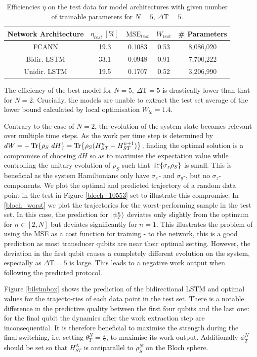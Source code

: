 \begin{table}[h]
	\centering
	\begin{tabular}{ c | c | c | c | c}
		Network Architecture & $\eta_{test} \ [\%]$ & $\mathrm{MSE}_{test}$ & $W_{test}$ & \# Parameters \\
		\hline
		FCANN        & 19.3 & 0.1083 & 0.53 & 8,086,020 \\
		Bidir. LSTM  & 33.1 & 0.0948 & 0.91 & 7,700,222 \\
		Unidir. LSTM & 19.5 & 0.1707 & 0.52 & 3,206,990\\
	\end{tabular}
	\caption{Efficiencies $\eta$ on the test data for model architectures with given number of trainable parameters for $N=5, \ \Delta \mathrm{T} = 5$.}
	\label{n5efftable}
\end{table}

The efficiency of the best model for $N=5, \ \Delta \mathrm{T} = 5$ is drastically lower than that for $N=2$.
Crucially, the models are unable to extract the test set average of the lower bound calculated by local optimisation $W_{lo} = 1.4$.

Contrary to the case of $N=2$, the evolution of the system state becomes relevant over multiple time steps.
As the work per time step is determined by $dW = -\Tr{\rho_S \ dH} = \Tr{\rho_S (H_{ST}^n - H_{ST}^{n+1})}$, finding the optimal solution is a compromise of choosing $dH$ so as to maximise the expectation value while controlling the unitary evolution of $\rho_S$ such that $\Tr{\sigma_z \rho_S}$ is small.
This is beneficial as the system Hamiltonians only have $\sigma_x$- and $\sigma_y$-, but no $\sigma_z$-components.
We plot the optimal and predicted trajectory of a random data point in the test in Figure \ref{bloch_10553} set to illustrate this compromise.
In \ref{bloch_worst} we plot the trajectories for the worst-performing sample in the test set.
In this case, the prediction for $\ket{\psi_T^n}$ deviates only slightly from the optimum for $n \in [2, N]$ but deviates significantly for $n=1$.
This illustrates the problem of using the MSE as a cost function for training - to the network, this is a good prediction as most transducer qubits are near their optimal setting.
However, the deviation in the first qubit causes a completely different evolution on the system, especially as $\Delta \mathrm{T} = 5$ is large.
This leads to a negative work output when following the predicted protocol.

Figure \ref{bilstmbox} shows the prediction of the bidirectional LSTM and optimal values for the trajecto-ries of each data point in the test set.
There is a notable difference in the predictive quality between the first four qubits and the last one: for the final qubit the dynamics after the work extraction step are inconsequential.
It is therefore beneficial to maximise the strength during the final switching, i.e. setting $\theta_T^N = \frac{\pi}{2}$, to maximise its work output.
Additionally $\phi_T^N$ should be set so that $H_{ST}^N$ is antiparallel to $\rho_S^N$ on the Bloch sphere.

